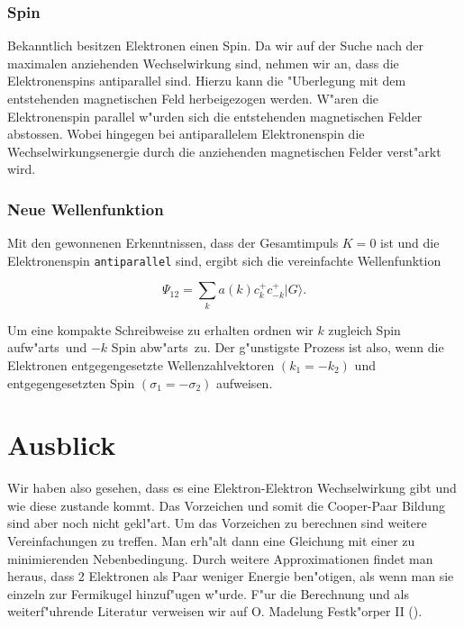 \begin{refsection}
\subsubsection{Spin}
Bekanntlich besitzen Elektronen einen Spin.
Da wir auf der Suche nach der maximalen anziehenden Wechselwirkung sind, nehmen wir an,
dass die Elektronenspins antiparallel sind.
Hierzu kann die "Uberlegung mit dem entstehenden magnetischen Feld herbeigezogen werden.
W"aren die Elektronenspin parallel w"urden sich die entstehenden magnetischen Felder abstossen.
Wobei hingegen bei antiparallelem Elektronenspin die Wechselwirkungsenergie durch die
anziehenden magnetischen Felder verst"arkt wird.

\subsubsection{Neue Wellenfunktion}
Mit den gewonnenen Erkenntnissen, dass der Gesamtimpuls $K=0$ ist und die Elektronenspin
\texttt{antiparallel} sind, ergibt sich die vereinfachte Wellenfunktion

\[
\Psi_{12}=\sum \limits_{k} a(k)c^+_{k}c^+_{-k}|G\rangle.
\]

Um eine kompakte Schreibweise zu erhalten ordnen wir $k$ zugleich \glqq Spin
aufw"arts\grqq~und $-k$ \glqq Spin abw"arts\grqq~zu.
Der g"unstigste Prozess ist also, wenn die Elektronen entgegengesetzte
Wellenzahlvektoren $(k_1 = -k_2)$ und entgegengesetzten Spin $(\sigma_1 = -\sigma_2)$ aufweisen.

\section{Ausblick}
Wir haben also gesehen, dass es eine Elektron-Elektron Wechselwirkung gibt und wie diese zustande kommt.
Das Vorzeichen und somit die Cooper-Paar Bildung sind aber noch nicht gekl"art.
Um das Vorzeichen zu berechnen sind weitere Vereinfachungen zu treffen.
Man erh"alt dann eine Gleichung mit einer zu minimierenden Nebenbedingung.
Durch weitere Approximationen findet man heraus,
dass 2 Elektronen als Paar weniger Energie ben"otigen, als wenn man sie einzeln zur Fermikugel
hinzuf"ugen w"urde.
F"ur die Berechnung und als weiterf"uhrende Literatur verweisen wir auf
O. Madelung Festk"orper II (\cite{supraleitung:madelung1}).


\printbibliography[heading=subbibliography]
\end{refsection}



